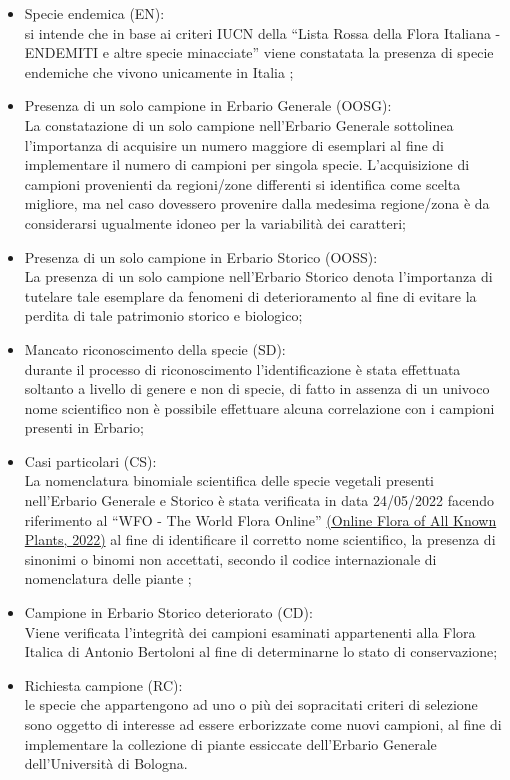 \documentclass[main.tex]{subfiles}
\begin{document}
\begin{itemize}
 \item Specie endemica (EN):\\
si intende che in base ai criteri IUCN della “Lista Rossa della Flora Italiana - ENDEMITI e altre specie minacciate” viene constatata la presenza di specie endemiche che vivono unicamente in Italia \citep{rossid};
 \item Presenza di un solo campione in Erbario Generale (OOSG):\\
La constatazione di un solo campione nell’Erbario Generale sottolinea l’importanza di acquisire un numero maggiore di esemplari al fine di implementare il numero di campioni per singola specie. L’acquisizione di campioni provenienti da regioni/zone differenti si identifica come scelta migliore, ma nel caso dovessero provenire dalla medesima regione/zona è da considerarsi ugualmente idoneo per la variabilità dei caratteri;
 \item Presenza di un solo campione in Erbario Storico (OOSS):\\
La presenza di un solo campione nell’Erbario Storico denota l’importanza di tutelare tale esemplare da fenomeni di deterioramento al fine di evitare la perdita di tale patrimonio storico e biologico;
 \item Mancato riconoscimento della specie (SD):\\
durante il processo di riconoscimento l’identificazione è stata effettuata soltanto a livello di genere e non di specie, di fatto in assenza di un univoco nome scientifico non è possibile effettuare alcuna correlazione con i campioni presenti in Erbario;
 \item Casi particolari (CS):\\
La nomenclatura binomiale scientifica delle specie vegetali presenti nell’Erbario Generale e Storico è stata verificata in data 24/05/2022 facendo riferimento al “WFO - The World Flora Online” \href{http://www.worldfloraonline.org/}{(Online Flora of All Known Plants, 2022)} al fine di identificare il corretto nome scientifico, la presenza di sinonimi o binomi non accettati, secondo il codice internazionale di nomenclatura delle piante \citep{turl};
 \item Campione in Erbario Storico deteriorato (CD):\\
Viene verificata l’integrità dei campioni esaminati appartenenti alla Flora Italica di Antonio Bertoloni al fine di determinarne lo stato di conservazione;
 \item Richiesta campione (RC):\\
le specie che appartengono ad uno o più dei sopracitati criteri di selezione sono oggetto di interesse ad essere erborizzate come nuovi campioni, al fine di implementare la collezione di piante essiccate dell’Erbario Generale dell’Università di Bologna.
\end{itemize}
\end{document}
